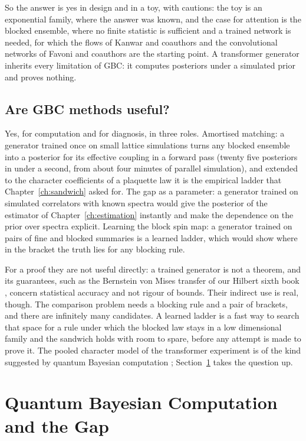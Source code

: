 So the answer is yes in design and in a toy, with cautions: the toy is an exponential family, where the answer was known, and the case for attention is the blocked ensemble, where no finite statistic is sufficient and a trained network is needed, for which the flows of Kanwar and coauthors \cite{Kan20} and the convolutional networks of Favoni and coauthors \cite{Fav22} are the starting point. A transformer generator inherits every limitation of GBC: it computes posteriors under a simulated prior and proves nothing.

\subsection{Are GBC methods useful?}

Yes, for computation and for diagnosis, in three roles. Amortised matching: a generator trained once on small lattice simulations turns any blocked ensemble into a posterior for its effective coupling in a forward pass (twenty five posteriors in under a second, from about four minutes of parallel simulation), and extended to the character coefficients of a plaquette law it is the empirical ladder that Chapter~\ref{ch:sandwich} asked for. The gap as a parameter: a generator trained on simulated correlators with known spectra would give the posterior of the estimator of Chapter~\ref{ch:estimation} instantly and make the dependence on the prior over spectra explicit. Learning the block spin map: a generator trained on pairs of fine and blocked summaries is a learned ladder, which would show where in the bracket the truth lies for any blocking rule.

For a proof they are not useful directly: a trained generator is not a theorem, and its guarantees, such as the Bernstein von Mises transfer of our Hilbert sixth book \cite{PS26h}, concern statistical accuracy and not rigour of bounds. Their indirect use is real, though. The comparison problem needs a blocking rule and a pair of brackets, and there are infinitely many candidates. A learned ladder is a fast way to search that space for a rule under which the blocked law stays in a low dimensional family and the sandwich holds with room to spare, before any attempt is made to prove it. The pooled character model of the transformer experiment is of the kind suggested by quantum Bayesian computation \cite{PSX23}; Section~\ref{ch:quantum} takes the question up.

\section{Quantum Bayesian Computation and the Gap}\label{ch:quantum}

